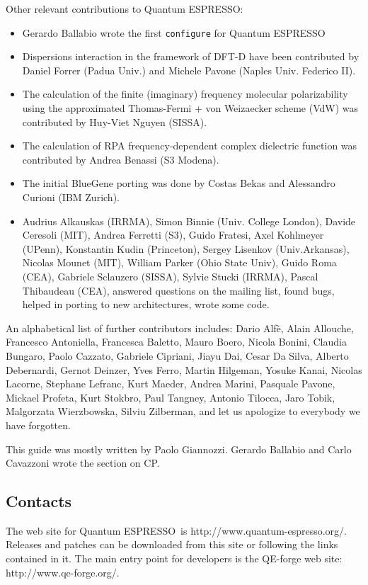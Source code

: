 \documentclass[12pt,a4paper]{article}
\def\qe{{\sc Quantum ESPRESSO}}
\begin{document}
Other relevant contributions to \qe:
\begin{itemize}
  \item Gerardo Ballabio wrote the first \texttt{configure} for \qe
  \item Dispersions interaction in the framework of DFT-D have been
contributed by Daniel Forrer (Padua Univ.) and Michele Pavone
(Naples Univ. Federico II).
  \item The calculation of the finite (imaginary) frequency molecular
polarizability using the approximated Thomas-Fermi  + von
Weizaecker scheme (VdW) was contributed by Huy-Viet Nguyen
(SISSA).
  \item The calculation of RPA frequency-dependent complex dielectric
function was contributed by Andrea Benassi (S3 Modena).
  \item The initial BlueGene porting was done by Costas Bekas and
  Alessandro Curioni (IBM Zurich).
  \item Audrius Alkauskas (IRRMA), 
Simon Binnie (Univ. College London), Davide Ceresoli (MIT),
Andrea Ferretti (S3), Guido Fratesi, Axel Kohlmeyer (UPenn),
Konstantin Kudin (Princeton), Sergey Lisenkov (Univ.Arkansas), 
Nicolas Mounet (MIT), William Parker (Ohio State Univ), 
Guido Roma (CEA), Gabriele Sclauzero (SISSA), Sylvie Stucki (IRRMA), 
Pascal Thibaudeau (CEA), 
answered questions on the mailing list, found bugs, helped in 
porting to new architectures, wrote some code.
\end{itemize}

An alphabetical list of further contributors includes: Dario Alf\`e, 
Alain Allouche, Francesco Antoniella, Francesca Baletto,
Mauro Boero, Nicola Bonini, Claudia Bungaro, 
Paolo Cazzato, Gabriele Cipriani, Jiayu Dai, Cesar Da Silva, 
Alberto Debernardi, Gernot Deinzer, Yves Ferro,
Martin Hilgeman,  Yosuke Kanai, Nicolas Lacorne, Stephane Lefranc,
Kurt Maeder, Andrea Marini, 
Pasquale Pavone,  Mickael Profeta, Kurt Stokbro, 
Paul Tangney, 
Antonio Tilocca, Jaro Tobik, 
Malgorzata Wierzbowska, Silviu Zilberman, 
and let us apologize to everybody we have forgotten.
 
This guide was mostly written by Paolo Giannozzi.
Gerardo Ballabio and Carlo Cavazzoni wrote the section on CP.

\subsection{Contacts}

The web site for \qe\ is http://www.quantum-espresso.org/.
Releases and patches can be downloaded from this
site or following the links contained in it. The main entry point for 
developers is the QE-forge web site: http://www.qe-forge.org/.
\end{document}
